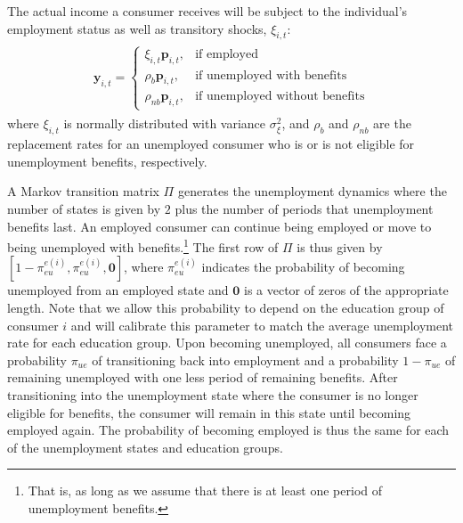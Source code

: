 \documentclass[\latexroot/\projectname]{subfiles}
\begin{document}
The actual income a consumer receives will be subject to the individual's employment status as well as transitory shocks, $\xi_{i,t}$:
\begin{equation}
  \begin{gathered}
    \begin{aligned}
      \mathbf{y}_{i,t} =   \begin{cases}
                             \xi_{i,t}\mathbf{p}_{i,t},  & \text{if employed}                    \\
                             \rho_b \mathbf{p}_{i,t},    & \text{if unemployed with benefits}    \\
                             \rho_{nb} \mathbf{p}_{i,t}, & \text{if unemployed without benefits}
                           \end{cases}
    \end{aligned}
  \end{gathered}
\end{equation}
where $\xi_{i,t}$ is normally distributed with variance $\sigma_{\xi}^2$, and $\rho_b$ and $\rho_{nb}$ are the replacement rates for an unemployed consumer who is or is not eligible for unemployment benefits, respectively.

A Markov transition matrix $\Pi$ generates the unemployment dynamics where the number of states is given by $2$ plus the number of periods that unemployment benefits last.
An employed consumer can continue being employed or move to being unemployed with benefits.\footnote{That is, as long as we assume that there is at least one period of unemployment benefits.} The first row of $\Pi$ is thus given by $[1-\pi_{eu}^{e(i)}, \pi_{eu}^{e(i)}, \mathbf{0}]$, where $\pi_{eu}^{e(i)}$ indicates the probability of becoming unemployed from an employed state and $\mathbf{0}$ is a vector of zeros of the appropriate length.
Note that we allow this probability to depend on the education group of consumer $i$ and will calibrate this parameter to match the average unemployment rate for each education group.
Upon becoming unemployed, all consumers face a probability $\pi_{ue}$ of transitioning back into employment and a probability $1-\pi_{ue}$ of remaining unemployed with one less period of remaining benefits.
After transitioning into the unemployment state where the consumer is no longer eligible for benefits, the consumer will remain in this state until becoming employed again.
The probability of becoming employed is thus the same for each of the unemployment states and education groups.
\end{document}
